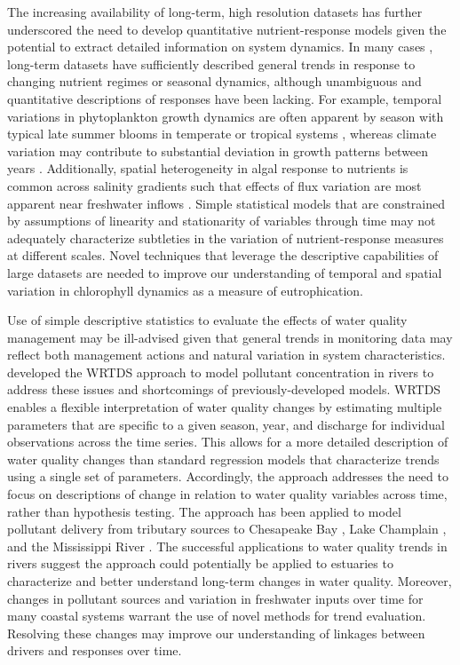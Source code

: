 \documentclass[letterpaper,12pt,oneside]{article}\usepackage{graphicx, color}
\begin{document}
The increasing availability of long-term, high resolution datasets has further underscored the need to develop quantitative nutrient-response models given the potential to extract detailed information on system dynamics.  In many cases \citep[e.g.,][]{Caffrey03, Greening06}, long-term datasets have sufficiently described general trends in response to changing nutrient regimes or seasonal dynamics, although unambiguous and quantitative descriptions of responses have been lacking.  For example, temporal variations in phytoplankton growth dynamics are often apparent by season with typical late summer blooms in temperate or tropical systems \citep{Cloern96}, whereas climate variation may contribute to substantial deviation in growth patterns between years \citep{Jassby02}.  Additionally, spatial heterogeneity in algal response to nutrients is common across salinity gradients such that effects of flux variation are most apparent near freshwater inflows \citep{Cloern96}.  Simple statistical models that are constrained by assumptions of linearity and stationarity  of variables through time may not adequately characterize subtleties in the variation of nutrient-response measures at different scales.  Novel techniques that leverage the descriptive capabilities of large datasets are needed to improve our understanding of temporal and spatial variation in chlorophyll dynamics as a measure of eutrophication.

Use of simple descriptive statistics to evaluate the effects of water quality management may be ill-advised given that general trends in monitoring data may reflect both management actions and natural variation in system characteristics.  \citet{Hirsch10} developed the \ac{WRTDS} approach to model pollutant concentration in rivers to address these issues and shortcomings of previously-developed models.  \ac{WRTDS} enables a flexible interpretation of water quality changes by estimating multiple parameters that are specific to a given season, year, and discharge for individual observations across the time series.  This allows for a more detailed description of water quality changes than standard regression models that characterize trends using a single set of parameters.  Accordingly, the approach addresses the need to focus on descriptions of change in relation to water quality variables across time, rather than hypothesis testing. The approach has been applied to model pollutant delivery from tributary sources to Chesapeake Bay \citep{Hirsch10,Moyer12,Zhang13}, Lake Champlain \citep{Medalie12}, and the Mississippi River \citep{Sprague11}.  The successful applications to water quality trends in rivers suggest the approach could potentially be applied to estuaries to characterize and better understand long-term changes in water quality.  Moreover, changes in pollutant sources and variation in freshwater inputs over time for many coastal systems warrant the use of novel methods for trend evaluation.  Resolving these changes may improve our understanding of linkages between drivers and responses over time. 
\end{document}
